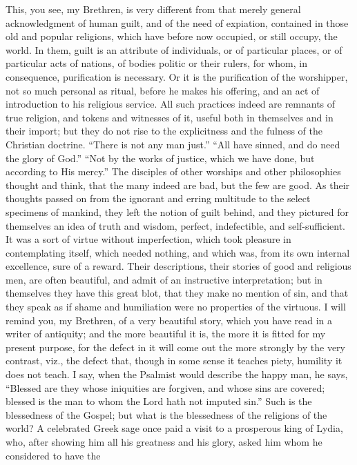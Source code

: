 This, you see, my Brethren, is very different from
that merely general acknowledgment of human guilt, and of
the need of expiation, contained in those old and popular
religions, which have before now occupied, or still
occupy, the world. In them, guilt is an attribute of
individuals, or of particular places, or of particular
acts of nations, of bodies politic or their rulers, for
whom, in consequence, purification is necessary. Or it is
the purification of the worshipper, not so much personal
as ritual, before he makes his offering, and an act of
introduction to his religious service. All such practices
indeed are remnants of true religion, and tokens and
witnesses of it, useful both in themselves and in their
import; but they do not rise to the explicitness and the
fulness of the Christian doctrine. ``There is not any
man just.'' ``All have sinned, and do need the
glory of God.'' ``Not by the works of justice,
which we have done, but according to His mercy.'' The
disciples of other worships and other philosophies
thought and think, that the many indeed are bad, but the
few are good. As their thoughts passed on from the
ignorant and erring multitude to the select specimens of
mankind, they left the notion of guilt behind, and they
pictured for themselves an idea of truth and wisdom,
perfect, indefectible, and self-sufficient. It was a sort
of virtue without imperfection, which took pleasure in
contemplating itself, which needed nothing, and which
was, from its own internal excellence, sure of a reward.
Their descriptions, their stories of good and religious
men, are often beautiful, and admit of an instructive
interpretation; but in themselves they have this great
blot, that they make no mention of sin, and that they
speak as if shame and humiliation were no properties of
the virtuous. I will remind you, my Brethren, of a very
beautiful story, which you have read in a writer of
antiquity; and the more beautiful it is, the more it is
fitted for my present purpose, for the defect in it will
come out the more strongly by the very contrast, viz., the
defect that, though in some sense it teaches piety,
humility it does not teach. I say, when the Psalmist
would describe the happy man, he says, ``Blessed are
they whose iniquities are forgiven, and whose sins are covered; blessed is the man to whom the Lord hath not imputed
sin.'' Such is the blessedness of the Gospel; but
what is the blessedness of the religions of the world? A
celebrated Greek sage once paid a visit to a prosperous
king of Lydia, who, after showing him all his greatness
and his glory, asked him whom he considered to have the
